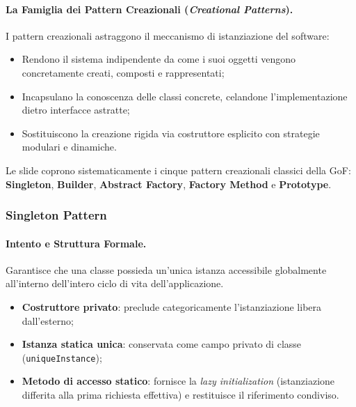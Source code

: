 \documentclass[12pt]{extarticle}
\begin{document}
\paragraph{La Famiglia dei Pattern Creazionali (\textit{Creational Patterns}).}
I pattern creazionali astraggono il meccanismo di istanziazione del software:
\begin{itemize}
    \item Rendono il sistema indipendente da come i suoi oggetti vengono concretamente creati, composti e rappresentati;
    \item Incapsulano la conoscenza delle classi concrete, celandone l'implementazione dietro interfacce astratte;
    \item Sostituiscono la creazione rigida via costruttore esplicito con strategie modulari e dinamiche.
\end{itemize}
Le slide coprono sistematicamente i cinque pattern creazionali classici della GoF: \textbf{Singleton}, \textbf{Builder}, \textbf{Abstract Factory}, \textbf{Factory Method} e \textbf{Prototype}.

\subsubsection{Singleton Pattern}
\paragraph{Intento e Struttura Formale.}
Garantisce che una classe possieda un'unica istanza accessibile globalmente all'interno dell'intero ciclo di vita dell'applicazione.
\begin{itemize}
    \item \textbf{Costruttore privato}: preclude categoricamente l'istanziazione libera dall'esterno;
    \item \textbf{Istanza statica unica}: conservata come campo privato di classe (\texttt{uniqueInstance});
    \item \textbf{Metodo di accesso statico}: fornisce la \textit{lazy initialization} (istanziazione differita alla prima richiesta effettiva) e restituisce il riferimento condiviso.
\end{itemize}
\end{document}
